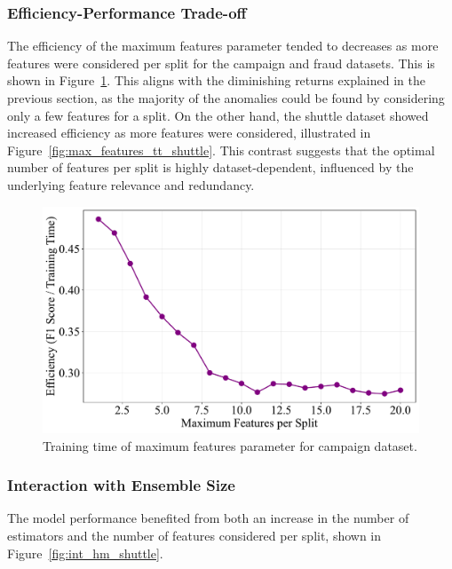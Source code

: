 \documentclass[10pt, conference]{IEEEtran}
\begin{document}
\subsubsection{Efficiency-Performance Trade-off}

The efficiency of the maximum features parameter tended to decreases as more features were considered per split for the campaign and fraud datasets. This is shown in Figure~\ref{fig:max_features_tt_campaign}. This aligns with the diminishing returns explained in the previous section, as the majority of the anomalies could be found by considering only a few features for a split. On the other hand, the shuttle dataset showed increased efficiency as more features were considered, illustrated in Figure~\ref{fig:max_features_tt_shuttle}. This contrast suggests that the optimal number of features per split is highly dataset-dependent, influenced by the underlying feature relevance and redundancy.




\begin{figure}[H]
	\centering
	\includegraphics[width=0.95\linewidth]{../results/campaign/max_features/efficiency_vs_max_features.pdf}
	\caption{Training time of maximum features parameter for campaign dataset.}
	\label{fig:max_features_tt_campaign}
\end{figure}

\subsubsection{Interaction with Ensemble Size}
The model performance benefited from both an increase in the number of estimators and the number of features considered per split, shown in Figure~\ref{fig:int_hm_shuttle}.
\end{document}
